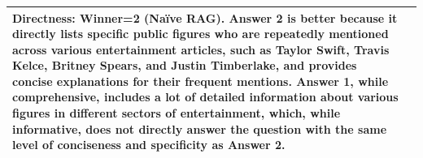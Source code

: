 \begin{table}[h]
\begin{tabular}{>{\raggedright\arraybackslash}p{}>{\raggedright\arraybackslash}p{}}
\vspace*{2mm}
\newline
\textbf{Directness: Winner=2 (Na\"ive RAG)}. Answer 2 is better because it directly lists specific public figures who are repeatedly mentioned across various entertainment articles, such as Taylor Swift, Travis Kelce, Britney Spears, and Justin Timberlake, and provides concise explanations for their frequent mentions. Answer 1, while comprehensive, includes a lot of detailed information about various figures in different sectors of entertainment, which, while informative, does not directly answer the question with the same level of conciseness and specificity as Answer 2.\vspace*{2mm}\\ \hline
    \end{tabular}
    \label{tab:example_assessment}
\end{table}